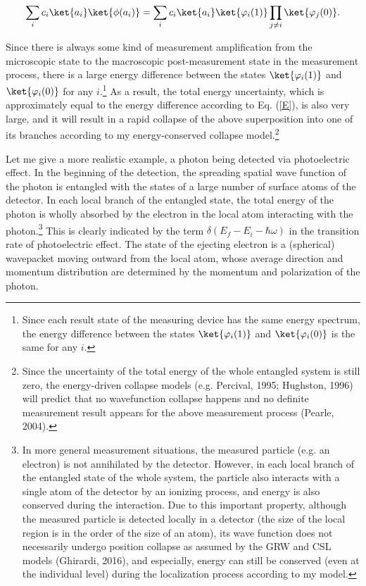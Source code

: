 \begin{equation}
\sum_{i} c_i \ket{a_i} \ket{\phi(a_i)} =  \sum_{i} c_i \ket{a_i} \ket{\varphi_i(1)}\prod_{j\neq i}\ket{\varphi_j(0)}.
\end{equation}

\noindent Since there is always some kind of measurement amplification from the microscopic state to the macroscopic post-measurement state in the measurement process, there is a large energy difference between the states $\ket{\varphi_i(1)}$ and $\ket{\varphi_i(0)}$ for any $i$.\footnote{Since each result state of the measuring device has the same energy spectrum, the energy difference between the states $\ket{\varphi_i(1)}$ and $\ket{\varphi_i(0)}$ is the same for any $i$.} As a result, the total energy uncertainty, which is approximately equal to the energy difference according to Eq. (\ref{E}), is also very large, and it will result in a rapid collapse of the above superposition into one of its branches according to my energy-conserved collapse model.\footnote{Since the uncertainty of the total energy of the whole entangled system is still zero, the energy-driven collapse models (e.g. Percival, 1995; Hughston, 1996) will predict that no wavefunction collapse happens and no definite measurement result appears for the above measurement process (Pearle, 2004).}

Let me give a more realistic example, a photon being detected via photoelectric effect. In the beginning of the detection, the spreading spatial wave function of the photon is entangled with the states of a large number of surface atoms of the detector. In each local branch of the entangled state, the total energy of the photon is wholly absorbed by the electron in the local atom interacting with the photon.\footnote{In more general measurement situations, the measured particle (e.g. an electron) is not annihilated by the detector. However, in each local branch of the entangled state of the whole system, the particle also interacts with a single atom of the detector by an ionizing process, and energy is also conserved during the interaction. Due to this important property, although the measured particle is detected locally in a detector (the size of the local region is in the order of the size of an atom), its wave function does not necessarily undergo position collapse as assumed by the GRW and CSL models (Ghirardi, 2016), and especially, energy can still be conserved (even at the individual level) during the localization process according to my model.} This is clearly indicated by the term $\delta (E_f-E_i-\hbar \omega)$ in the transition rate of photoelectric effect. The state of the ejecting electron is a (spherical) wavepacket moving outward from the local atom, whose average direction and momentum distribution are determined by the momentum and polarization of the photon.

